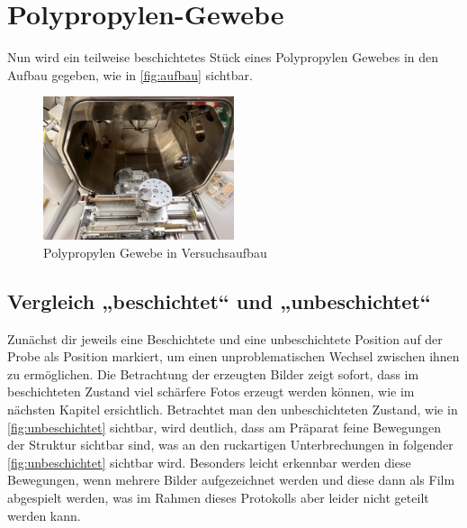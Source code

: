 \documentclass[12pt,english,ngerman]{scrartcl}
\begin{document}
\section{Polypropylen-Gewebe}

Nun wird ein teilweise beschichtetes Stück eines Polypropylen Gewebes in den
Aufbau gegeben, wie in \autoref{fig:aufbau} sichtbar.

\begin{figure}[H]
	\begin{center}
		\includegraphics[width =0.5\textwidth]{./figures/aufbau.png}
	\end{center}
	\caption{Polypropylen Gewebe in Versuchsaufbau
	}\label{fig:aufbau}
\end{figure}

\subsection{Vergleich „beschichtet“ und „unbeschichtet“}

Zunächst dir jeweils eine Beschichtete und eine unbeschichtete Position auf der
Probe als Position markiert, um einen unproblematischen Wechsel zwischen ihnen
zu ermöglichen. Die Betrachtung der erzeugten Bilder zeigt sofort, dass im
beschichteten Zustand viel schärfere Fotos erzeugt werden können, wie im
nächsten Kapitel ersichtlich. Betrachtet man den unbeschichteten Zustand, wie
in \autoref{fig:unbeschichtet} sichtbar, wird deutlich, dass am Präparat feine
Bewegungen der Struktur sichtbar sind, was an den ruckartigen Unterbrechungen
in folgender \autoref{fig:unbeschichtet} sichtbar wird. Besonders leicht
erkennbar werden diese Bewegungen, wenn mehrere Bilder aufgezeichnet werden und
diese dann als Film abgespielt werden, was im Rahmen dieses Protokolls aber
leider nicht geteilt werden kann.
\end{document}
